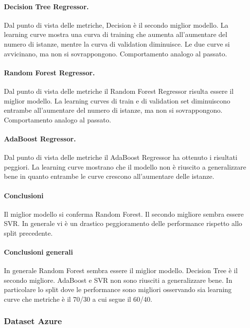 \paragraph{\textbf{Decision Tree Regressor}.}
Dal punto di vista delle metriche, Decision è il secondo miglior modello.
La learning curve mostra una curva di training che aumenta all'aumentare del numero di istanze, mentre la curva di validation diminuisce. Le due curve si avvicinano, ma non si sovrappongono. Comportamento analogo al passato.
\paragraph{\textbf{Random Forest Regressor}.}
Dal punto di vista delle metriche il Random Forest Regressor risulta essere il miglior modello.
La learning curves di train e di validation set diminuiscono entrambe all'aumentare del numero di istanze, ma non si sovrappongono. Comportamento analogo al passato.
\paragraph{\textbf{AdaBoost Regressor}.}
Dal punto di vista delle metriche il AdaBoost Regressor ha ottenuto i risultati peggiori.
La learning curve mostrano che il modello non è riuscito a generalizzare bene in quanto entrambe le curve crescono all'aumentare delle istanze.


\paragraph{\textbf{Conclusioni}} Il miglior modello si conferma Random Forest. Il secondo migliore sembra essere SVR. In generale vi è un drastico peggioramento delle performance rispetto allo split precedente.



\paragraph{\textbf{Conclusioni generali}} 
In generale Random Forest sembra essere il miglior modello. Decision Tree è il secondo migliore. AdaBoost e SVR non sono riusciti a generalizzare bene. In particolare lo split dove le performance sono migliori osservando sia learning curve che metriche è il 70/30 a cui segue il 60/40.



\subsubsection{Dataset Azure}



